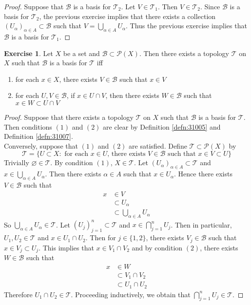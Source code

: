 \documentclass[12pt]{amsart}
\theoremstyle{definition}
\newtheorem{ex}[definition]{Exercise}
\newcommand{\al}{\alpha}
\newcommand{\MB}{\mathcal{B}}
\newcommand{\MP}{\mathcal{P}}
\newcommand{\MT}{\mathcal{T}}
\DeclareMathOperator*{\0}{\mbf{0}}
\DeclareMathOperator*{\1}{\mbf{1}}
\newcommand{\lex}[1]{\label{ex:#1}}
\newcommand{\rd}[1]{Definition \ref{defn:#1}}
\begin{document}
	\begin{proof}
	Suppose that $\MB$ is a basis for $\MT_2$. Let $V \in \MT_1$. Then $V \in \MT_2$. Since $\MB$ is a basis for $\MT_2$, the previous exercise implies that there exists a collection $(U_{\al})_{\al \in A} \subset \MB$ such that $V = \bigcup\limits_{\al \in A} U_{\al}$. Thus the previous exercise implies that $\MB$ is a basis for $\MT_1$. 
	\end{proof}
	
	\begin{ex} \lex{31009}
	Let $X$ be a set and $\MB \subset \MP(X)$. Then there exists a topology $\MT$ on $X$ such that $\MB$ is a basis for $\MT$ iff 
	\begin{enumerate}
	\item for each $x \in X$, there exists $V \in \MB$ such that $x \in V$
	\item for each $U, V \in \MB$, if $x \in U \cap V$, then there exists $W \in \MB$ such that $x \in W \subset U \cap V$
	\end{enumerate}
	\end{ex}
	
	\begin{proof}
	Suppose that there exists a topology $\MT$ on $X$ such that $\MB$ is a basis for $\MT$. Then conditions $(1)$ and $(2)$ are clear by \rd{31005} and \rd{31007}. \\
	Conversely, suppose that $(1)$ and $(2)$ are satisfied. Define $\MT \subset \MP(X)$ by 
	$$\MT =  \{ U \subset X: \text{ for each $x \in U$, there exists $V \in \MB$ such that $x \in V \subset U$} \}$$
	Trivially $\varnothing \in \MT$. By condition $(1)$, $X \in \MT$. Let $(U_{\al})_{\al \in A} \subset \MT$ and $x \in \bigcup\limits_{\al \in A}U_{\al}$. Then there exists $\al \in A$ such that $x \in U_{\al}$. Hence there exists $V \in \MB$ such that 
	\begin{align*}
	x 
	& \in V \\
	& \subset U_{\al} \\
	& \subset \bigcup\limits_{\al \in A}U_{\al}
	\end{align*}
	So $\bigcup\limits_{\al \in A}U_{\al} \in \MT$. Let $(U_j)_{j=1}^n \subset \MT$ and $x \in \bigcap\limits_{j=1}^n U_j$. Then in particular, $U_1, U_2 \in \MT$ and $x \in  U_1 \cap U_2$. Then for $j \in \{1, 2\}$, there exists $V_j \in \MB$ such that $x \in V_j \subset U_j$. This implies that $x \in V_1 \cap V_2$ and by condition $(2)$, there exists $W \in \MB$ such that
	\begin{align*}
	x 
	& \in W \\
	& \subset V_1 \cap V_2 \\
	& \subset U_1 \cap U_2
	\end{align*}
	Therefore $U_1 \cap U_2 \in \MT$. Proceeding inductively, we obtain that $\bigcap\limits_{j=1}^n U_j \in \MT$.
	\end{proof}
	
\end{document}

